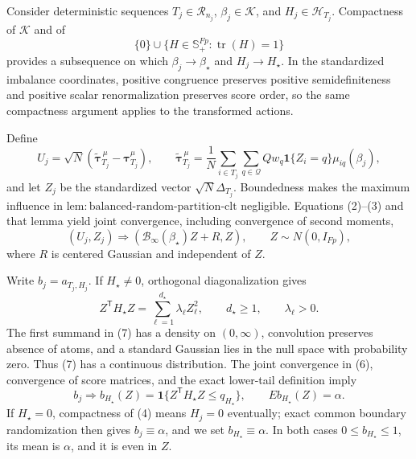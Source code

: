 Consider deterministic sequences \(T_j\in\mathcal R_{n_j}\), \(\beta_j\in\mathcal K\), and \(H_j\in\mathcal H_{T_j}\).  Compactness of \(\mathcal K\) and of
\[
\{0\}\cup\{H\in\mathbb S_+^{Fp}:\operatorname{tr}(H)=1\}
\tag{4}
\]
provides a subsequence on which \(\beta_j\to\beta_\star\) and \(H_j\to H_\star\).  In the standardized imbalance coordinates, positive congruence preserves positive semidefiniteness and positive scalar renormalization preserves score order, so the same compactness argument applies to the transformed actions.

Define
\[
U_j=\sqrt N\left(
\widetilde{\boldsymbol\tau}^{\,\mu}_{T_j}
-\boldsymbol\tau_{T_j}^{\mu}\right),
\qquad
\widetilde{\boldsymbol\tau}^{\,\mu}_{T_j}
=\frac1N\sum_{i\in T_j}\sum_{q\in\mathcal Q}
Qw_q\mathbf 1\{Z_i=q\}\mu_{iq}(\beta_j),
\tag{5}
\]
and let \(Z_j\) be the standardized vector \(\sqrt N\Delta_{T_j}\).  Boundedness makes the maximum influence in \(\mathrm{lem{:}balanced\text{-}random\text{-}partition\text{-}clt}\) negligible.  Equations (2)--(3) and that lemma yield joint convergence, including convergence of second moments,
\[
(U_j,Z_j)\Rightarrow
(\mathcal B_\infty(\beta_\star)Z+R,Z),
\qquad Z\sim N(0,I_{Fp}),
\tag{6}
\]
where \(R\) is centered Gaussian and independent of \(Z\).

Write \(b_j=a_{T_j,H_j}\).  If \(H_\star\neq0\), orthogonal diagonalization gives
\[
Z^{\mathsf T}H_\star Z
=\sum_{\ell=1}^{d_\star}\lambda_\ell Z_\ell^2,
\qquad d_\star\geq1,
\qquad \lambda_\ell>0.
\tag{7}
\]
The first summand in (7) has a density on \((0,\infty)\), convolution preserves absence of atoms, and a standard Gaussian lies in the null space with probability zero.  Thus (7) has a continuous distribution.  The joint convergence in (6), convergence of score matrices, and the exact lower-tail definition imply
\[
b_j\Rightarrow b_{H_\star}(Z)
=\mathbf 1\{Z^{\mathsf T}H_\star Z\leq q_{H_\star}\},
\qquad E b_{H_\star}(Z)=\alpha.
\tag{8}
\]
If \(H_\star=0\), compactness of (4) means \(H_j=0\) eventually; exact common boundary randomization then gives \(b_j\equiv\alpha\), and we set \(b_{H_\star}\equiv\alpha\).  In both cases \(0\leq b_{H_\star}\leq1\), its mean is \(\alpha\), and it is even in \(Z\).

